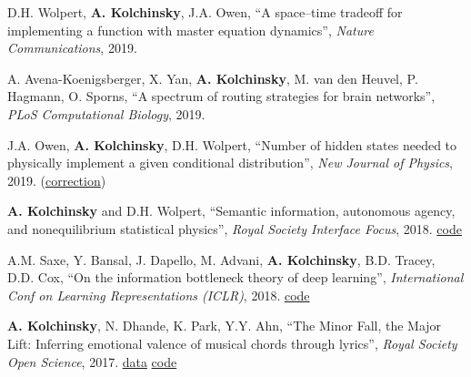 D.H. Wolpert, \textbf{A. Kolchinsky}, J.A. Owen, ``A space–time tradeoff for implementing a function with master equation dynamics'', \emph{Nature Communications}, 2019. 
 

A. Avena-Koenigsberger, X. Yan, \textbf{A. Kolchinsky}, M. van den Heuvel, P. Hagmann, O. Sporns, 
``A spectrum of routing strategies for brain networks'', \emph{PLoS Computational Biology}, 2019. 
 

J.A. Owen, \textbf{A. Kolchinsky}, D.H. Wolpert, ``Number of hidden states needed to physically implement a given conditional distribution'', \emph{New Journal of Physics}, 2019. (\href{https://iopscience.iop.org/article/10.1088/1367-2630/ab60f8}{correction}) 
 

\textbf{A. Kolchinsky} and D.H. Wolpert, 
``Semantic information, autonomous agency, and nonequilibrium statistical physics'', 
\emph{Royal Society Interface Focus}, 2018. 
\href{https://github.com/artemyk/semantic_information/}{code} 

A.M. Saxe, Y. Bansal, J. Dapello, M. Advani, \textbf{A. Kolchinsky}, B.D. Tracey, D.D. Cox, 
``On the information bottleneck theory of deep learning'', \emph{International Conf on Learning Representations (ICLR)}, 2018. 
 \href{https://github.com/artemyk/ibsgd/tree/iclr2018}{code} 

\textbf{A. Kolchinsky}, N. Dhande, K. Park, Y.Y. Ahn, ``The Minor Fall, the Major Lift: Inferring emotional valence of musical chords through lyrics'', \emph{Royal Society Open Science}, 2017. 
\href{https://doi.org/10.6084/m9.figshare.5413060.v1.}{data} 
\href{https://github.com/artemyk/chordsentiment}{code} 

